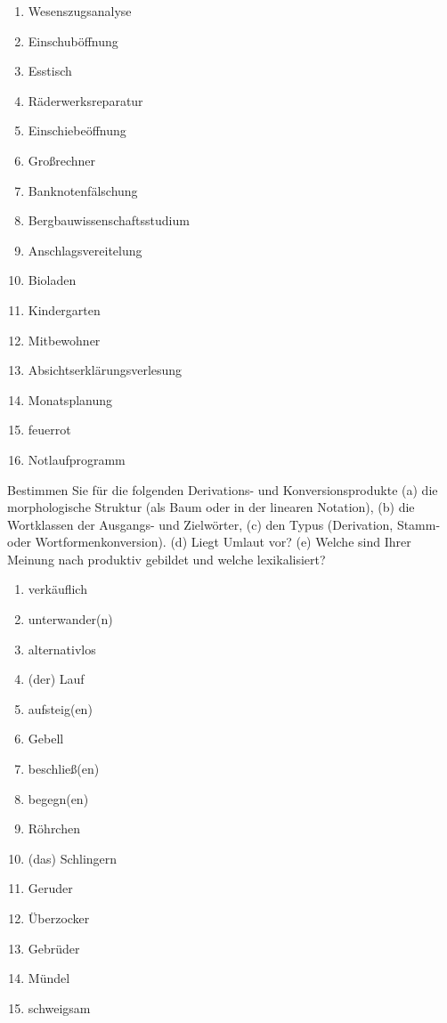 \begin{enumerate}\Lf
  \item Wesenszugsanalyse
  \item Einschuböffnung
  \item Esstisch
  \item Räderwerksreparatur
  \item Einschiebeöffnung
  \item Großrechner
  \item Banknotenfälschung
  \item Bergbauwissenschaftsstudium
  \item Anschlagsvereitelung
  \item Bioladen
  \item Kindergarten
  \item Mitbewohner
  \item Absichtserklärungsverlesung
  \item Monatsplanung
  \item feuerrot
  \item Notlaufprogramm
\end{enumerate}

\Uebung \label{u72} Bestimmen Sie für die folgenden Derivations- und Konversionsprodukte (a) die morphologische Struktur (als Baum oder in der linearen Notation), (b) die Wortklassen der Ausgangs- und Zielwörter, (c) den Typus (Derivation, Stamm- oder Wortformenkonversion). (d) Liegt Umlaut vor? (e) Welche sind Ihrer Meinung nach produktiv gebildet und welche lexikalisiert? 

\begin{enumerate}\Lf
  \item verkäuflich
  \item unterwander(n)
  \item alternativlos
  \item (der) Lauf
  \item aufsteig(en)
  \item Gebell
  \item beschließ(en)
  \item begegn(en)
  \item Röhrchen
  \item (das) Schlingern
  \item Geruder
  \item Überzocker
  \item Gebrüder
  \item Mündel
  \item schweigsam
\end{enumerate}

